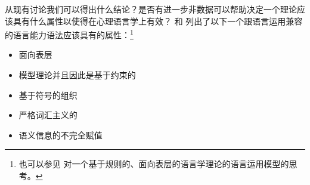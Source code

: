 从现有讨论我们可以得出什么结论？是否有进一步非数据可以帮助决定一个理论应该具有什么属性以使得在心理语言学上有效？ \citet*{SWB2003a}和 \citet{SW2011a,SW2015a}列出了以下一个跟语言运用兼容的语言能力语法应该具有的属性：\footnote{%
也可以参见 对一个基于规则的、面向表层的语言学理论的语言运用模型的思考。  
}
\begin{itemize}
\item 面向表层
\item 模型理论并且因此是基于约束的
\item 基于符号的组织
\item 严格词汇主义的
\item 语义信息的不完全赋值
\end{itemize}

